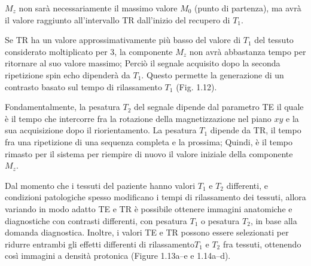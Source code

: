 \documentclass[leqno,10pt,twocolumn,a4paper]{article}
\begin{document}
	$M_z$ non sarà necessariamente il massimo valore $M_0$ (punto di partenza), ma avrà il valore raggiunto all'intervallo TR dall'inizio del recupero di $T_1$. \par Se TR ha un valore approssimativamente
	più basso del valore di $T_1$ del tessuto considerato moltiplicato per 3, la componente $M_z$ non avrà abbastanza tempo per ritornare al suo valore massimo; Perciò il segnale acquisito dopo la seconda
	ripetizione spin echo dipenderà da $T_1$. Questo permette la generazione di un contrasto basato sul tempo di rilassamento $T_1$ (Fig. 1.12). \par Fondamentalmente, la pesatura $T_2$ del segnale 
	dipende dal parametro TE il quale è il tempo che intercorre fra la rotazione della magnetizzazione nel piano $xy$ e la sua acquisizione dopo il riorientamento. La pesatura $T_1$ dipende da TR, il tempo fra
	una ripetizione di una sequenza completa e la prossima; Quindi, è il tempo rimasto per il sistema per riempire di nuovo il valore iniziale della componente $M_z$. \par Dal momento che i tessuti del paziente
	hanno valori $T_1$ e $T_2$ differenti, e condizioni patologiche spesso modificano i tempi di rilassamento dei tessuti, allora variando in modo adatto TE e TR è possibile ottenere immagini anatomiche e 
	diagnostiche con contrasti differenti, con pesatura $T_1$ o pesatura $T_2$, in base alla domanda diagnostica. Inoltre, i valori TE e TR possono essere selezionati per ridurre entrambi gli effetti differenti
	di rilassamento$T_1$ e $T_2$ fra tessuti, ottenendo così immagini a densità protonica (Figure 1.13a--e e 1.14a--d).
\end{document}
